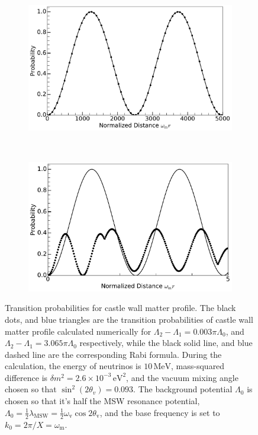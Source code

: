 \documentclass[%
reprint,
 amsmath,amssymb,
 aps,
]{revtex4-1}
\begin{document}
\begin{figure}
    \centering
    \begin{subfigure}[b]{0.5\textwidth}
        \centering
        \includegraphics[width=\columnwidth]{assets/castle-wall-2}
    \caption{}
    \label{fig-akhmedovOscPlt-a}
    \end{subfigure}%
    ~ 
    \begin{subfigure}[b]{0.5\textwidth}
        \centering
        \includegraphics[width=\columnwidth]{assets/castle-wall-1}
        \caption{}
        \label{fig-akhmedovOscPlt-b}
    \end{subfigure}
    \caption{Transition probabilities for castle wall matter profile. 
    The black dots, and blue triangles are the transition probabilities of castle wall matter profile calculated numerically for $\Lambda_2-\Lambda_1=0.003\pi\Lambda_0$, and $\Lambda_2-\Lambda_1=3.065\pi\Lambda_0$ respectively, while the black solid line, and blue dashed line are the corresponding Rabi formula. During the calculation, the energy of neutrinos is $10\,\mathrm{MeV}$, mass-squared difference is $\delta m^2=2.6\times 10^{-3}\,\mathrm{eV^2}$, and the vacuum mixing angle chosen so that $\sin^2(2\theta_v)=0.093$. The background potential $\Lambda_0$ is chosen so that it's half the MSW resonance potential, $\Lambda_0 = \frac{1}{2}\lambda_{\mathrm{MSW}}=\frac{1}{2}\omega_{\mathrm{v}}\cos 2\theta_{\mathrm v}$, and the base frequency is set to $k_0 = 2\pi/X = \omega_{\mathrm{m}}$.
                 }
    \label{fig-akhmedovOscPlt}
\end{figure}
\end{document}
